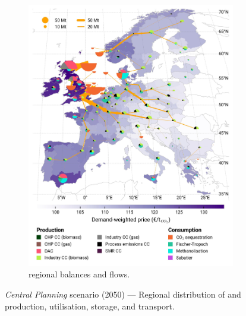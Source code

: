 \documentclass[preprint,12pt,sort&compress]{elsarticle}
\begin{document}
\begin{figure}[htbp]
\begin{subfigure}[t]{0.49\textwidth}
      \includegraphics[width=1\textwidth]{maps/greenfield-pipelines/base_s_adm___2050-balance_map_co2_stored} 
      \vspace{-0.7cm}
      \caption{ regional balances and flows.}
      \label{fig:CP_lt_2050_co2}
  \end{subfigure}
  \caption{\textit{Central Planning} scenario (2050) --- Regional distribution of  and  production, utilisation, storage, and transport.}
  \label{fig:CP_lt_2050}
\end{figure}

\clearpage
 

\end{document}

